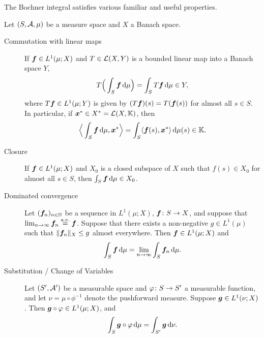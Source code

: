 The Bochner integral satisfies various familiar and useful properties.
\begin{prop}
  Let $(S,\mathcal{A},\mu)$ be a measure space and $X$ a Banach space.
  \begin{description}
  \item[Commutation with linear maps] If $\bm{f} \in L^1(\mu;X)$ and $T \in \mathcal{L}(X,Y)$ is a bounded linear map into a Banach space $Y$,
    \begin{equation*}
      T\Big( \int_S \bm{f} \, \mathrm{d}\mu \Big) = \int_S T\bm{f} \, \mathrm{d}\mu \in Y,
    \end{equation*}
    where $T\bm{f} \in L^1(\mu;Y)$ is given by $(T\bm{f})(s) = T(\bm{f}(s))$ for almost all $s \in S$.
    In particular, if $\bm{x}^* \in X^* = \mathcal{L}(X,\mathbb{K})$, then
    \begin{equation*}
      \Big\langle \int_S \bm{f} \, \mathrm{d}\mu, \bm{x}^* \Big\rangle = \int_S \langle \bm{f}(s), \bm{x}^* \rangle \, \mathrm{d}\mu(s) \in \mathbb{K}.
    \end{equation*}
  \item[Closure] If $\bm{f} \in L^1(\mu;X)$ and $X_0$ is a closed subspace of $X$ such that $f(s) \in X_0$ for almost all $s \in S$, then $\int_S \bm{f} \, \mathrm{d}\mu \in X_0$.
  \item[Dominated convergence] Let $(\bm{f}_n)_{n \in \mathbb{N}}$ be a sequence in $L^1(\mu;X)$, $\bm{f} \colon S \rightarrow X$, and suppose that $\lim_{n \to \infty} \bm{f}_n \stackrel{\mathrm{a.e.}}{=} \bm{f}$.
    Suppose that there exists a non-negative $g \in L^1(\mu)$ such that $\|\bm{f}_n\|_X \leq g$ almost everywhere.
    Then $\bm{f} \in L^1(\mu;X)$ and
    \begin{equation*}
      \int_S \bm{f} \, \mathrm{d}\mu = \lim_{n \to \infty} \int_S \bm{f}_n \, \mathrm{d}\mu.
    \end{equation*}
  \item[Substitution / Change of Variables]
    Let $(S',\mathcal{A}')$ be a measurable space and $\varphi \colon S \rightarrow S'$ a measurable function, and let $\nu = \mu \circ \phi^{-1}$ denote the pushforward measure.
    Suppose $\bm{g} \in L^1(\nu;X)$.
    Then $\bm{g} \circ \varphi \in L^1(\mu;X)$, and
    \begin{equation*}
      \int_S \bm{g} \circ \varphi \, \mathrm{d}\mu = \int_{S'} \bm{g} \, \mathrm{d}\nu.
    \end{equation*}
    
  \end{description}
\end{prop}

